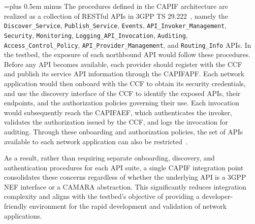 {\spaceskip=\font plus 0.5em minus \font
The procedures defined in the \acs{CAPIF} architecture are realized as a collection of RESTful \acsp{API} in \acs{3GPP} TS 29.222~\cite{ETSI_CAPIF_TS_129_222_V18_6_0}, namely the \texttt{Discover\allowbreak\_Service}, \texttt{Publish\allowbreak\_Service}, \texttt{Events}, \texttt{API\allowbreak\_Invoker\allowbreak\_Management}, \texttt{Security}, \texttt{Monitoring}, \texttt{Logging\allowbreak\_API\allowbreak\_Invocation}, \texttt{Auditing}, \texttt{Access\allowbreak\_Control\allowbreak\_Policy}, \texttt{API\allowbreak\_Provider\allowbreak\_Management}, and \texttt{Routing\allowbreak\_Info} \acsp{API}.}
In the testbed, the exposure of each northbound \acs{API} would follow these procedures. Before any \acs{API} becomes available, each provider should register with the \acs{CCF} and publish its service \acs{API} information through the \acs{CAPIFAPF}. Each network application would then onboard with the \acs{CCF} to obtain its security credentials, and use the discovery interface of the \acs{CCF} to identify the exposed \acsp{API}, their endpoints, and the authorization policies governing their use. Each invocation would subsequently reach the \acs{CAPIFAEF}, which authenticates the invoker, validates the authorization issued by the \acs{CCF}, and logs the invocation for auditing. Through these onboarding and authorization policies, the set of \acsp{API} available to each network application can also be restricted~\cite{ETSI_CAPIF_TS_123_222_V18_4_0}.

As a result, rather than requiring separate onboarding, discovery, and authentication procedures for each \acs{API} suite, a single \acs{CAPIF} integration point consolidates these concerns regardless of whether the underlying \acs{API} is a \acs{3GPP} \acs{NEF} interface or a CAMARA abstraction. This significantly reduces integration complexity and aligns with the testbed's objective of providing a developer-friendly environment for the rapid development and validation of network applications.
